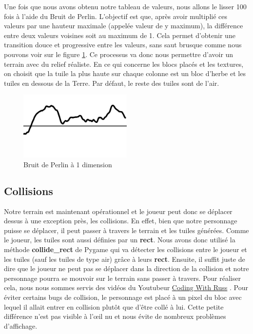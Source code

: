 \documentclass[12pt]{article}
\begin{document}
\newpage
Une fois que nous avons obtenu notre tableau de valeurs, nous allons le lisser 100 fois à l’aide du Bruit de Perlin. L’objectif est que, après avoir multiplié ces valeurs par une hauteur maximale (appelée valeur de y maximum), la différence entre deux valeurs voisines soit au maximum de 1. Cela permet d’obtenir une transition douce et progressive entre les valeurs, sans saut brusque comme nous pouvons voir sur le figure \ref{perlin1d}. Ce processus va donc nous permettre d'avoir un terrain avec du relief réaliste. En ce qui concerne les blocs placés et les textures, on choisit que la tuile la plus haute sur chaque colonne est un bloc d'herbe et les tuiles en dessous de la Terre. Par défaut, le reste des tuiles sont de l'air.\par %
\begin{figure}[!h]
  \centering
  \includegraphics[width=0.5\textwidth]{assets/PerlinNoise1d.png}
  \caption{Bruit de Perlin à 1 dimension}
  \label{perlin1d}
\end{figure}

\subsection{Collisions}

Notre terrain est maintenant opérationnel et le joueur peut donc se déplacer dessus à une exception près, les collisions. En effet, bien que notre personnage puisse se déplacer, il peut passer à travers le terrain et les tuiles générées. Comme le joueur, les tuiles sont aussi définies par un \textbf{rect}. Nous avons donc utilisé la méthode \textbf{collide\_rect} de Pygame qui va détecter les collisions entre le joueur et les tuiles (sauf les tuiles de type air) grâce à leurs \textbf{rect}. Ensuite, il suffit juste de dire que le joueur ne peut pas se déplacer dans la direction de la collision et notre personnage pourra se mouvoir sur le terrain sans passer à travers. Pour réaliser cela, nous nous sommes servis des vidéos du Youtubeur \underline{Coding With Russ} \cite{codingwithruss-channel}. Pour éviter certains bugs de collision, le personnage est placé à un pixel du bloc avec lequel il allait entrer en collision plutôt que d'être collé à lui. Cette petite différence n'est pas visible à l'œil nu et nous évite de nombreux problèmes d'affichage. \par
\end{document}
